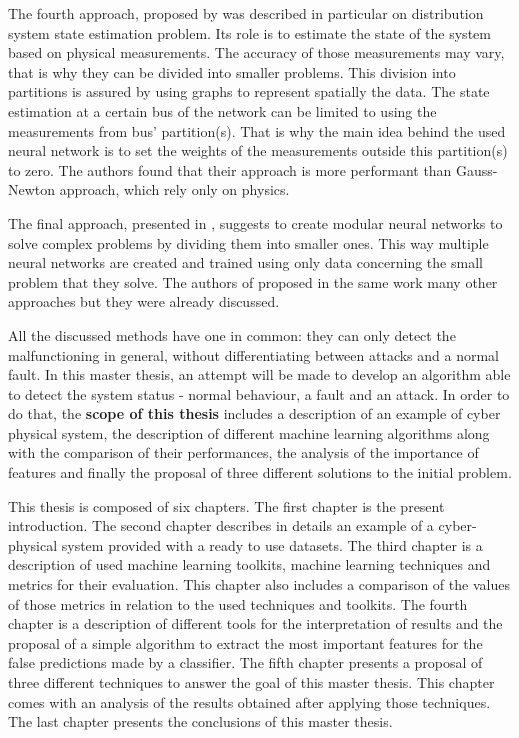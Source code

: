 The fourth approach, proposed by \cite{zamzam_physics-aware_2019} was described in particular on distribution system state estimation problem. Its role is to estimate the state of the system based on physical measurements. The accuracy of those measurements may vary, that is why they can be divided into smaller problems. This division into partitions is assured by using graphs to represent spatially the data.  The state estimation at a certain bus of the network can be limited to using the measurements from bus' partition(s). That is why the main idea behind the used neural network is to set the weights of the measurements outside this partition(s) to zero. The authors found that their approach is more performant than Gauss-Newton approach, which rely only on physics.

The final approach, presented in \cite{karpatne_theory-guided_2017}, suggests to create modular neural networks to solve complex problems by dividing them into smaller ones. This way multiple neural networks are created and trained using only data concerning the small problem that they solve. The authors of \cite{karpatne_theory-guided_2017} proposed in the same work many other approaches but they were already discussed.

All the discussed methods have one in common: they can only detect the malfunctioning in general, without differentiating between attacks and a normal fault. In this master thesis, an attempt will be made to develop an algorithm able to detect the system status - normal behaviour, a fault and an attack. In order to do that, the \textbf{scope of this thesis} includes a description of an example of cyber physical system, the description of different machine learning algorithms along with the comparison of their performances, the analysis of the importance of features and finally the proposal of three different solutions to the initial problem.

This thesis is composed of six chapters. The first chapter is the present introduction. The second chapter describes in details an example of a cyber-physical system provided with a ready to use datasets. The third chapter is a description of used machine learning toolkits, machine learning techniques and metrics for their evaluation. This chapter also includes a comparison of the values of those metrics in relation to the used techniques and toolkits. The fourth chapter is a description of different tools for the interpretation of results and the proposal of a simple algorithm to extract the most important features for the false predictions made by a classifier. The fifth chapter presents a proposal of three different techniques to answer the goal of this master thesis. This chapter comes with an analysis of the results obtained after applying those techniques. The last chapter presents the conclusions of this master thesis.
